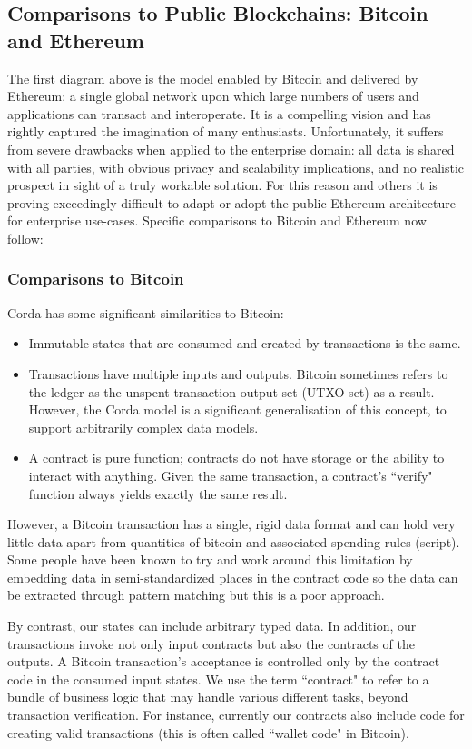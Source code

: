 \documentclass{article}
\begin{document}
\subsection{Comparisons to Public Blockchains: Bitcoin and Ethereum}

The first diagram above is the model enabled by Bitcoin and delivered by Ethereum: a single global network upon which large numbers of users and applications can transact and interoperate. It is a compelling vision and has rightly captured the imagination of many enthusiasts.  Unfortunately, it suffers from severe drawbacks when applied to the enterprise domain: all data is shared with all parties, with obvious privacy and scalability implications, and no realistic prospect in sight of a truly workable solution. For this reason and others it is proving exceedingly difficult to adapt or adopt the public Ethereum architecture for enterprise use-cases. Specific comparisons to Bitcoin and Ethereum now follow:

\subsubsection{Comparisons to Bitcoin}
Corda has some significant similarities to Bitcoin:
\begin{itemize}
\item{Immutable states that are consumed and created by transactions is the same.}
\item{Transactions have multiple inputs and outputs. Bitcoin sometimes refers to the ledger as the unspent transaction output set (UTXO set) as a result. However, the Corda model is a significant generalisation of this concept, to support arbitrarily complex data models.}
\item{A contract is pure function; contracts do not have storage or the ability to interact with anything. Given the same transaction, a contract's ``verify" function always yields exactly the same result.}
\end{itemize}

However, a Bitcoin transaction has a single, rigid data format and can hold very little data apart from quantities of bitcoin and associated spending rules (script). Some people have been known to try and work around this limitation by embedding data in semi-standardized places in the contract code so the data can be extracted through pattern matching but this is a poor approach.

By contrast, our states can include arbitrary typed data. In addition, our transactions invoke not only input contracts but also the contracts of the outputs. A Bitcoin transaction's acceptance is controlled only by the contract code in the consumed input states. We use the term ``contract" to refer to a bundle of business logic that may handle various different tasks, beyond transaction verification. For instance, currently our contracts also include code for creating valid transactions (this is often called ``wallet code" in Bitcoin).
\end{document}

